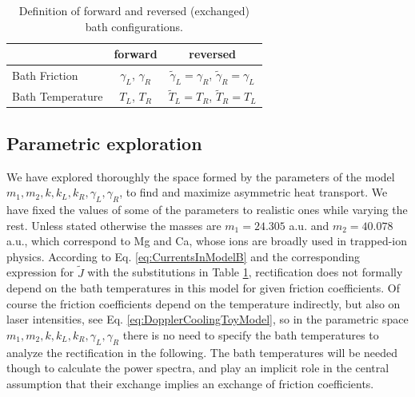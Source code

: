 
\begin{table}[]
\caption{Definition of forward and reversed (exchanged) bath configurations.}
\begin{tabular}{lcc}
\hline
                 & forward                & reversed                                                       \\ \hline
Bath Friction    & $\gamma_L$, $\gamma_R$ & $\tilde{\gamma}_L =\gamma_R $,  $\tilde{\gamma}_R =\gamma_L $   \\
Bath Temperature & $T_L$, $T_R$           & $\tilde{T}_L =T_R $,  $\tilde{T}_R =T_L $                     \\
\hline
\end{tabular}
\label{tab:reversed_bath}
\end{table}
%
%
\subsection{Parametric exploration}
%
%
%
We have explored thoroughly the space formed by the parameters of the model $m_1,m_2,k,k_L,k_R,\gamma_L,\gamma_R$, to find
and maximize asymmetric heat transport. We have fixed the values of some of the parameters to realistic ones while varying the rest. Unless stated otherwise the masses are
$m_1 = 24.305$ a.u. and $m_2 = 40.078$ a.u., which correspond to Mg and Ca, whose ions are broadly used in trapped-ion physics. According to Eq. \eqref{eq:CurrentsInModelB} and the corresponding expression for $\tilde{J}$ with the substitutions in Table \ref{tab:reversed_bath},
rectification does not formally depend on the bath temperatures in this model for given friction coefficients.
Of course the friction coefficients depend on the temperature indirectly, but also on laser intensities, see Eq. \eqref{eq:DopplerCoolingToyModel}, so in the parametric space $m_1,m_2,k,k_L,k_R,\gamma_L,\gamma_R$ there is no need to specify the bath temperatures to analyze the rectification in the following. The bath temperatures will be needed though
to calculate the power spectra, and play an implicit role in the central assumption that their exchange implies an exchange of
friction coefficients.


